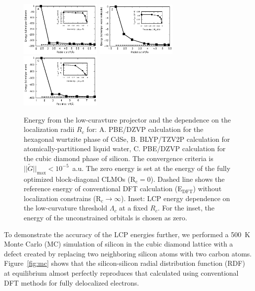 \documentclass[10pt,amsmath,twocolumn,aps,prl,superscriptaddress,floatfix]{revtex4-1}
\begin{document}
\begin{figure}
\centering
\includegraphics[width=0.35\textwidth]{CdSe_conv}
\includegraphics[width=0.35\textwidth]{H2O_conv}
\includegraphics[width=0.35\textwidth]{Si_conv}
\caption{Energy from the low-curavture projector and the dependence on the localization radii $R_c$ for: A. PBE/DZVP calculation for the hexagonal wurtzite phase of CdSe, B. BLYP/TZV2P calculation for atomically-partitioned liquid water, C. PBE/DZVP calculation for the cubic diamond phase of silicon. The convergence criteria is $\vert\vert \tilde{G} \vert\vert_{\text{max}} < 10^{-5}$~a.u. The zero energy is set at the energy of the fully optimized block-diagonal CLMOs (R$_c = 0$). Dashed line shows the reference energy of conventional DFT calculation (E$_{\text{DFT}}$) without localization constrains (R$_c\rightarrow \infty$). 
Inset: LCP energy dependence on the low-curvature threshold $\Lambda_c$ at a fixed $R_c$. For the inset, the energy of the unconstrained orbitals is chosen as zero.}
\label{fig:accuracy}
\end{figure}

To demonstrate the accuracy of the LCP energies further, we performed a 500~K Monte Carlo (MC) simulation of silicon in the cubic diamond lattice with a defect created by replacing two neighboring silicon atoms with two carbon atoms. Figure~\ref{fig:mc} shows that the silicon-silicon radial distribution function (RDF) at equilibrium almost perfectly reproduces that calculated using conventional DFT methods for fully delocalized electrons. 
\end{document}
